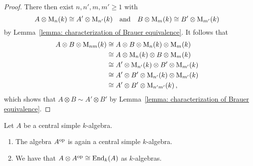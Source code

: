 \begin{proof}
  There then exist $n, n', m, m' \geq 1$ with
  \[
          A \otimes \operatorname{M}_n(k)
    \cong A' \otimes \operatorname{M}_{n'}(k)
    \quad\text{and}\quad
          B \otimes \operatorname{M}_m(k)
    \cong B'  \otimes \operatorname{M}_{m'}(k)
  \]
  by Lemma~\ref{lemma: characterization of Brauer equivalence}.
  It follows that
  \begin{align*}
            A \otimes B \otimes \operatorname{M}_{nm}(k)
    &\cong  A \otimes B \otimes \operatorname{M}_{n}(k) \otimes \operatorname{M}_{m}(k) \\
    &\cong  A \otimes \operatorname{M}_{n}(k) \otimes B \otimes \operatorname{M}_{m}(k) \\
    &\cong  A' \otimes \operatorname{M}_{n'}(k) \otimes B' \otimes \operatorname{M}_{m'}(k) \\
    &\cong  A' \otimes B' \otimes \operatorname{M}_{n'}(k) \otimes \operatorname{M}_{m'}(k) \\
    &\cong  A' \otimes B' \otimes \operatorname{M}_{n'm'}(k) \,,
  \end{align*}
  which shows that $A \otimes B \sim A' \otimes B'$ by Lemma~\ref{lemma: characterization of Brauer equivalence}.
\end{proof}


\begin{lemma}
  Let $A$ be a central simple $k$-algebra.
  \begin{enumerate}
    \item
      The algebra $A^{\mathrm{op}}$ is again a central simple $k$-algebra.
    \item
      We have that $A \otimes A^{\mathrm{op}} \cong \operatorname{End}_k(A)$ as $k$-algebras.
  \end{enumerate}
\end{lemma}


